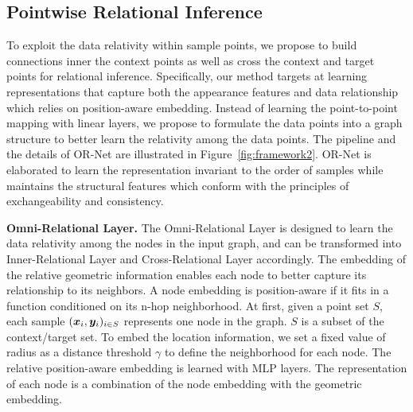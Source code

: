 \documentclass[sigconf]{acmart} %
\begin{document}



\subsection{Pointwise Relational Inference}
To exploit the data relativity within sample points, we propose to build connections inner the context points as well as cross the context and target points for relational inference.
Specifically, our method targets at learning representations that capture both the appearance features and data relationship which relies on position-aware embedding.
Instead of learning the point-to-point mapping with linear layers, we propose to formulate the data points into a graph structure to better learn the relativity among the data points. 
The pipeline and the details of OR-Net are illustrated in Figure~\ref{fig:framework2}. 
OR-Net is elaborated to learn the representation invariant to the order of samples while maintains the structural features which conform with the principles of exchangeability and consistency. 


\noindent\textbf{Omni-Relational Layer.}
The Omni-Relational Layer is designed to learn the data relativity among the nodes in the input graph, and can be transformed into Inner-Relational Layer and Cross-Relational Layer accordingly. 
The embedding of the relative geometric information enables each node to better capture its relationship to its neighbors. A node embedding is position-aware if it fits in a function conditioned on its n-hop neighborhood.
At first, given a point set $S$, each sample $({\bm{x}}_i, {\bm{y}}_i)_{i\in S}$ represents one node in the graph. $S$ is a subset of the context/target set. To embed the location information, we set a fixed value of radius as a distance threshold $\gamma$ to define the neighborhood for each node. 
The relative position-aware embedding is learned with MLP layers. The representation of each node is a combination of the node embedding with the geometric embedding. 
\end{document}
